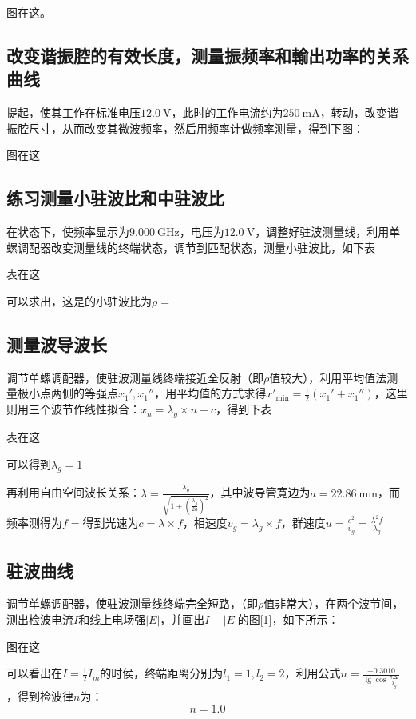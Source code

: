 \documentclass[font=fandol]{mpltx}
\begin{document}
图在这。

\subsection{改变谐振腔的有效长度，测量振频率和輸出功率的关系曲线}
提起，使其工作在标准电压$\qty{12.0}{\V}$，此时的工作电流约为$\qty{250}{\mA}$，转动，改变谐振腔尺寸，从而改变其微波频率，然后用频率计做频率测量，得到下图：

图在这

\subsection{练习测量小驻波比和中驻波比}
在状态下，使频率显示为$\qty{9.000}{\GHz}$，电压为$\qty{12.0}{\V}$，调整好驻波测量线，利用单螺调配器改变测量线的终端状态，调节到匹配状态，测量小驻波比，如下表

表在这

可以求出，这是的小驻波比为$\rho=$

\subsection{测量波导波长}
调节单螺调配器，使驻波测量线终端接近全反射（即$\rho$值较大），利用平均值法测量极小点两侧的等强点$x_1',x_1''$，用平均值的方式求得$x'_{\min}=\frac{1}{2}(x_1'+x_1'')$，这里则用三个波节作线性拟合：$x_n=\lambda_g\times n + c$，得到下表

表在这

可以得到$\lambda_g= 1$

再利用自由空间波长关系：$\lambda=\frac{\lambda_g}{\sqrt{1+(\frac{\lambda_g}{2a})^2}}$，其中波导管寛边为$a=\qty{22.86}{\mm}$，而频率测得为$f=$得到光速为$c=\lambda\times f$，相速度$v_g=\lambda_g\times f$，群速度$u=\frac{c^2}{v_g}=\frac{\lambda^2f}{\lambda_g}$

\subsection{驻波曲线}
调节单螺调配器，使驻波测量线终端完全短路，（即$\rho$值非常大），在两个波节间，测出检波电流$I$和线上电场强$|E|$，并画出$I-|E|$的图\ref{1}，如下所示：

图在这

可以看出在$I=\frac{1}{2}I_m$的时侯，终端距离分别为$l_1=1,l_2=2$，利用公式$n=\frac{-0.3010}{\lg{\cos{\frac{\pi\Delta l}{\lambda_g}}}}$，得到检波律$n$为：
$$n=1.0$$
\end{document}
